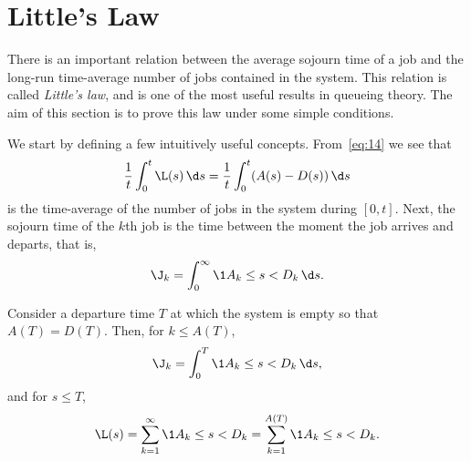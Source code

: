 



\section{Little's Law}
\label{sec:littles-law}

There is an important relation between the average sojourn time of a job and the long-run time-average number of jobs contained in the system.
This relation is called \emph{Little's law}, and is one of the most useful results in queueing theory.
The aim of this section is to prove this law under some simple conditions.


We start by defining a few intuitively useful concepts. From~\cref{eq:14} we see that
\begin{equation*}
\frac 1 t\int_0^t \L(s)\, \d s = \frac 1 t\int_0^t (A(s)-D(s)) \, \d s
\end{equation*}
is the time-average of the number of jobs in the system during
$[0,t]$.
Next,
the sojourn time of the $k$th job is the time between the moment the job arrives and departs, that is,
\begin{equation*}
 \J_k = \int_0^\infty \1{A_k \leq s < D_k}\,\d s.
\end{equation*}

Consider a departure time $T$ at which the system is empty so that $A(T) = D(T)$.
Then, for $k\leq A(T)$,
\begin{equation*}
 \J_k = \int_0^T \1{A_k \leq s < D_k}\,\d s,
\end{equation*}
and for $s\leq T$,
\begin{equation*}
\L(s) = \sum_{k=1}^\infty \1{A_k \leq s < D_k} = \sum_{k=1}^{A(T)}\1{A_k \leq s < D_k}.
\end{equation*}

